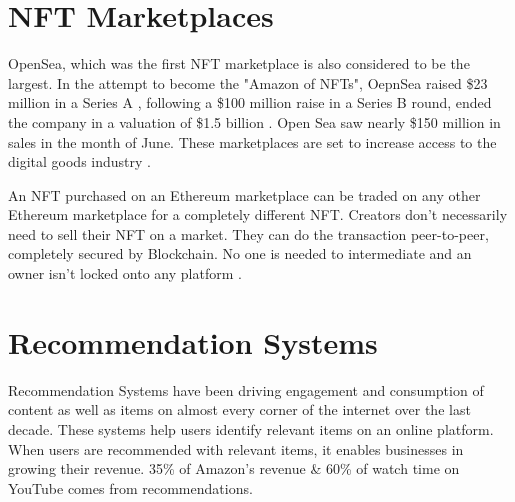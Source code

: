 \documentclass[a4paper, 12pt, oneside]{report}
\begin{document}

\section{NFT Marketplaces}


OpenSea, which was the first NFT marketplace is also considered to be the largest. In the attempt to become the "Amazon of NFTs", OepnSea raised \$23 million in a Series A \autocite{hackett_this_2021}, following a \$100 million raise in a Series B round, ended the company in a valuation of \$1.5 billion \autocite{dfinzer_announcing_2021, matney_nft_2021}. Open Sea saw nearly \$150 million in sales in the month of June.
These marketplaces are set to increase access to the digital goods industry \autocite{chevet_blockchain_2018}.




An NFT purchased on an Ethereum marketplace can be traded on any other Ethereum marketplace for a completely different NFT. Creators don't necessarily need to sell their NFT on a market. They can do the transaction peer-to-peer, completely secured by Blockchain. No one is needed to intermediate and an owner isn't locked onto any platform \autocite{noauthor_erc-721_nodate}.



\section{Recommendation Systems}
Recommendation Systems have been driving engagement and consumption of content as well as items on almost every corner of the internet over the last decade.
These systems help users identify relevant items on an online platform. When users are recommended with relevant items, it enables businesses in growing their revenue. 35\% of Amazon’s revenue \autocite{naumov_deep_2019} \& 60\% of watch time on YouTube \autocite{noauthor_recommendations_nodate} comes from recommendations.
\end{document}
